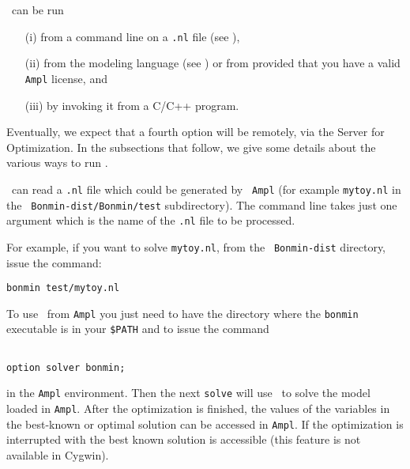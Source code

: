 \StartPageSummary
{}
\EndPageSummary
\NavigationPanel



\Bonmin\ can be run
\begin{itemize}
\item [(i)] from a command line on a {\tt .nl} file
(see \cite{Gay}),
\item [(ii)] from the modeling language  (see
\cite{AMPL}) or from  provided
that you have a valid {\tt Ampl} license, and
\item [(iii)] by invoking it from a C/C++ program.
\end{itemize}
Eventually, we expect that a fourth option will be remotely, via the
 Server for Optimization.
In the subsections that follow, we give some details about the
various ways to run \Bonmin.

\Bonmin\ can read a {\tt .nl} file which could be generated by {\tt
Ampl} (for example {\tt mytoy.nl} in the {\tt
Bonmin-dist/Bonmin/test} subdirectory). The command line takes just
one argument which is the name of the {\tt .nl} file to be
processed.

For example, if you want to solve {\tt mytoy.nl}, from the {\tt
Bonmin-dist} directory, issue the command:

\begin{verbatim}
bonmin test/mytoy.nl
\end{verbatim}

To use \Bonmin\ from {\tt Ampl} you just need to have the directory where the
{\tt bonmin} executable is in your {\tt \$PATH} and to issue the
command

\begin{verbatim}

option solver bonmin;

\end{verbatim}
in the {\tt Ampl} environment. Then the next {\tt solve} will
use \Bonmin\ to solve the model loaded in {\tt Ampl}.
After the optimization is finished, the values of the variables in the best-known
or optimal solution can be accessed in {\tt Ampl}. If the optimization is interrupted
with {\tt <CTRL-C>} the best known solution is accessible (this feature is not available in Cygwin).\\

